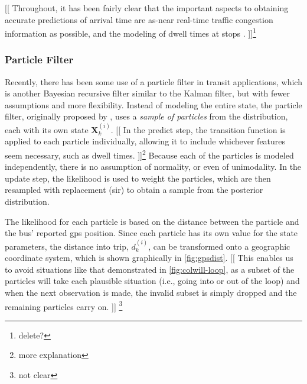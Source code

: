 \documentclass[12pt,a4paper]{article}
\newcommand{\bX}{\mathbf{X}}
\newcommand{\kf}{Kalman filter}
\newcommand{\pf}{particle filter}
\begin{document}
[[ Throughout, it has been fairly clear that the important aspects to obtaining
accurate predictions of arrival time are as-near real-time traffic congestion information
as possible, and the modeling of dwell times at stops \citep{cn}. ]]\footnote{delete?}



\subsubsection{Particle Filter}
\label{sec:particle-filter}

Recently, there has been some use of a \pf{} in transit applications,
which is another Bayesian recursive filter similar to the \kf{},
but with fewer assumptions and more flexibility.
Instead of modeling the entire state,
the \pf{}, originally proposed by \cite{gordon-etal:1993},
uses a \emph{sample of particles} from the distribution,
each with its own state $\bX_k^{(i)}$.
[[ In the predict step,
the transition function is applied to each particle individually,
allowing it to include whichever features seem necessary,
such as dwell times. ]]\footnote{more explanation}
Because each of the particles is modeled independently,
there is no assumption of normality, or even of unimodality.
In the update step, the likelihood is used to weight the particles,
which are then resampled with replacement (\gls{sir}) to obtain a
sample from the posterior distribution.


The likelihood for each particle is based on the distance between the particle
and the bus' reported \gls{gps} position.
Since each particle has its own value for the state parameters,
the distance into trip, $d_k^{(i)}$, can be transformed onto a geographic coordinate system,
which is shown graphically in \cref{fig:gpsdist}.
[[ This enables us to avoid situations like that demonstrated in \cref{fig:colwill-loop},
as a subset of the particles will take each plausible situation
(i.e., going into or out of the loop) and when  the next observation is made,
the invalid subset is simply dropped and the remaining particles carry on. ]]%
\footnote{not clear}
\end{document}
